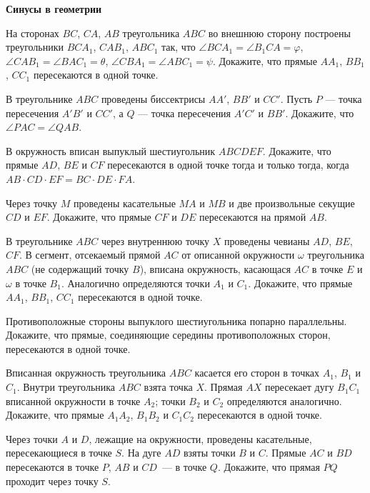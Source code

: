 \documentclass{article}
\begin{document}
    \large

    \begin{center}
        \textbf{Синусы в геометрии}
    \end{center}

    \begin{enumerate_boxed}
        \item На сторонах $BC$, $CA$, $AB$ треугольника $ABC$ во внешнюю сторону построены
        треугольники $BCA_1$, $CAB_1$, $ABC_1$ так, что $\angle BCA_1=\angle B_{1}CA=\varphi$,
        $\angle CAB_1=\angle BAC_1=\theta$, $\angle CBA_1=\angle ABC_1=\psi$.
        Докажите, что прямые $AA_1$, $BB_1$, $CC_1$ пересекаются в одной точке.

        \item  В треугольнике $ABC$ проведены биссектрисы $AA'$, $BB'$ и $CC'$.
        Пусть $P$ --- точка пересечения $A'B'$ и $CC'$, а $Q$ --- точка пересечения $A'C'$ и $BB'$.
        Докажите, что $\angle PAC = \angle QAB$.

        \item В окружность вписан выпуклый шестиугольник $ABCDEF$.
        Докажите, что прямые $AD$, $BE$ и $CF$ пересекаются в одной точке тогда и только тогда, когда $AB\cdot CD\cdot EF=BC\cdot DE\cdot FA$.

        \item Через точку $M$ проведены касательные $MA$ и $MB$ и две произвольные секущие $CD$ и $EF$.
        Докажите, что прямые $CF$ и $DE$ пересекаются на прямой $AB$.

        \item В треугольнике $ABC$ через внутреннюю точку $X$ проведены чевианы $AD$, $BE$, $CF$.
        В сегмент, отсекаемый прямой $AC$ от описанной окружности $\omega$ треугольника $ABC$ (не содержащий точку $B$), вписана окружность, касающася $AC$ в точке $E$ и $\omega$ в точке $B_1$.
        Аналогично определяются точки $A_1$ и $C_1$.
        Докажите, что прямые $AA_1$, $BB_1$, $CC_1$ пересекаются в одной точке.

        \item Противоположные стороны выпуклого шестиугольника попарно параллельны.
        Докажите, что прямые, соединяющие середины противоположных сторон, пересекаются в одной точке.

        \item Вписанная окружность треугольника $ABC$ касается его сторон в точках $A_1$, $B_1$ и $C_1$.
        Внутри треугольника $ABC$ взята точка $X$.
        Прямая $AX$ пересекает дугу $B_{1}C_1$ вписанной окружности в точке $A_2$; точки $B_2$ и $C_2$ определяются аналогично.
        Докажите, что прямые $A_{1}A_2$, $B_{1}B_2$ и $C_{1}C_2$ пересекаются в одной точке.

        \item Через точки $A$ и $D$, лежащие на окружности, проведены касательные, пересекающиеся в точке $S$.
        На дуге $AD$ взяты точки $B$ и $C$.
        Прямые $AC$ и $BD$ пересекаются в точке $P$, $AB$ и $CD$~--- в точке $Q$.
        Докажите, что прямая $PQ$ проходит через точку $S$.


    \end{enumerate_boxed}
\end{document}
